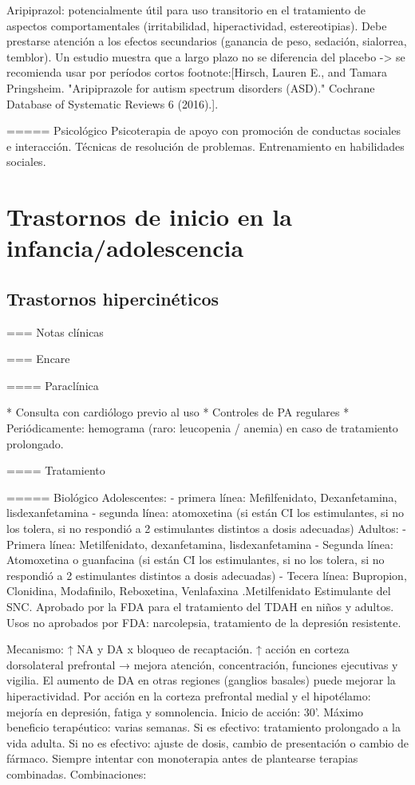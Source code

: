 \documentclass{scrbook}
\begin{document}
Aripiprazol: potencialmente útil para uso transitorio en el tratamiento de aspectos comportamentales (irritabilidad, hiperactividad, estereotipias). Debe prestarse atención a los efectos secundarios (ganancia de peso, sedación, sialorrea, temblor). Un estudio muestra que a largo plazo no se diferencia del placebo -> se recomienda usar por períodos cortos footnote:[Hirsch, Lauren E., and Tamara Pringsheim. "Aripiprazole for autism spectrum disorders (ASD)." Cochrane Database of Systematic Reviews 6 (2016).].

===== Psicológico
Psicoterapia de apoyo con promoción de conductas sociales e interacción.
Técnicas de resolución de problemas.
Entrenamiento en habilidades sociales.

\part{Trastornos de inicio en la infancia/adolescencia}
\chapter{Trastornos hipercinéticos}

=== Notas clínicas

=== Encare

==== Paraclínica

* Consulta con cardiólogo previo al uso
* Controles de PA regulares
* Periódicamente: hemograma (raro: leucopenia / anemia) en caso de tratamiento prolongado.

==== Tratamiento

===== Biológico
Adolescentes: 
- primera línea: Mefilfenidato, Dexanfetamina, lisdexanfetamina
- segunda línea: atomoxetina (si están CI los estimulantes, si no los tolera, si no respondió a 2 estimulantes distintos a dosis adecuadas)
Adultos:
- Primera línea: Metilfenidato, dexanfetamina, lisdexanfetamina
- Segunda línea: Atomoxetina o guanfacina (si están CI los estimulantes, si no los tolera, si no respondió a 2 estimulantes distintos a dosis adecuadas)
- Tecera línea: Bupropion, Clonidina, Modafinilo, Reboxetina, Venlafaxina
.Metilfenidato
Estimulante del SNC.
Aprobado por la FDA para el tratamiento del TDAH en niños y adultos.
Usos no aprobados por FDA: narcolepsia, tratamiento de la depresión resistente.

Mecanismo: ↑ NA y DA x bloqueo de recaptación. ↑ acción en corteza dorsolateral prefrontal → mejora atención, concentración, funciones ejecutivas y vigilia. El aumento de DA en otras regiones (ganglios basales) puede mejorar la hiperactividad. Por acción en la corteza prefrontal medial y el hipotélamo: mejoría en depresión, fatiga y somnolencia.
Inicio de acción: 30'. Máximo beneficio terapéutico: varias semanas.
Si es efectivo: tratamiento prolongado a la vida adulta.
Si no es efectivo: ajuste de dosis, cambio de presentación o cambio de fármaco.
Siempre intentar con monoterapia antes de plantearse terapias combinadas.
Combinaciones:
\end{document}
